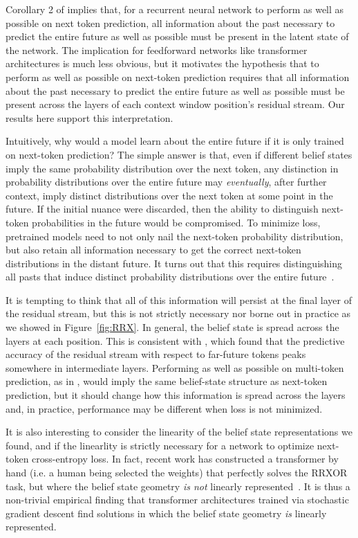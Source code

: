\documentclass{article}
\begin{document}
Corollary 2 of \cite{Shal98a} implies that, for a recurrent neural network to perform as well as possible on next token prediction, all information about the past necessary to predict the
entire future as well as possible
must be present in the latent state of the network. The implication for feedforward networks like transformer architectures is much less obvious, but it
motivates the hypothesis
that
to perform as well as possible on next-token prediction requires that all information about the past necessary to predict the entire future as well as possible must be present across the layers of each context window position's residual stream. Our results here support this interpretation.

Intuitively, why would a model learn about the entire future if it is only trained on next-token prediction?
The simple answer is that, even if different belief states imply the same probability distribution over the next token,
any distinction in probability distributions over the entire future
may \emph{eventually}, after further context, imply distinct distributions over the next token at some point in the future. If the initial nuance were discarded, then the ability to distinguish next-token probabilities in the future would be compromised.
To minimize loss, pretrained models need to not only nail the next-token probability distribution, but also retain all information necessary to get the correct next-token distributions in the distant future. It turns out that this requires distinguishing all pasts that induce distinct probability distributions over the entire future~\citep{Shal98a}.

It is tempting to think that all of this information will persist at the final layer of the residual stream, but this is not strictly necessary nor borne out in practice as we showed in Figure~\ref{fig:RRX}. In general, the belief state is spread across the layers at each position. This is consistent with
\cite{Pal23_Future},
which found that the predictive accuracy
of the residual stream with respect to far-future tokens peaks somewhere in intermediate layers.
Performing as well as possible on multi-token prediction, as in
\cite{Gloeckle24_Better},
would imply the same belief-state structure as next-token prediction,
but it should change how this information is spread across the layers and, in practice, performance may be different when loss is not minimized.

It is also interesting to consider the linearity of the belief state representations we found, and if the linearlity is strictly necessary for a network to optimize next-token cross-entropy loss. In fact, recent work has constructed a transformer by hand (i.e. a human being selected the weights) that perfectly solves the RRXOR task, but where the belief state geometry \textit{is not} linearly represented~\citep{GoldsteinHand}. It is thus a non-trivial empirical finding that transformer architectures trained via stochastic gradient descent find solutions in which the belief state geometry \textit{is} linearly represented.
\end{document}
